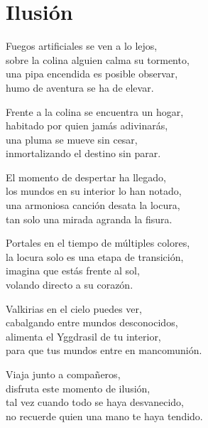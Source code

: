 \section*{Ilusión}
\label{Ilusion}

\vspace{1em}
\begin{center}
Fuegos artificiales se ven a lo lejos,\\ 
sobre la colina alguien calma su tormento,\\ 
una pipa encendida es posible observar,\\ 
humo de aventura se ha de elevar.

\vspace{1em} 
Frente a la colina se encuentra un hogar,\\ 
habitado por quien jamás adivinarás,\\ 
una pluma se mueve sin cesar,\\ 
inmortalizando el destino sin parar.

\vspace{1em} 
El momento de despertar ha llegado,\\ 
los mundos en su interior lo han notado,\\ 
una armoniosa canción desata la locura,\\ 
tan solo una mirada agranda la fisura.

\vspace{1em} 
Portales en el tiempo de múltiples colores,\\ 
la locura solo es una etapa de transición,\\ 
imagina que estás frente al sol,\\ 
volando directo a su corazón.

\vspace{1em} 
Valkirias en el cielo puedes ver,\\ 
cabalgando entre mundos desconocidos,\\ 
alimenta el Yggdrasil de tu interior,\\ 
para que tus mundos entre en mancomunión.

\vspace{1em} 
Viaja junto a compañeros,\\ 
disfruta este momento de ilusión,\\ 
tal vez cuando todo se haya desvanecido,\\ 
no recuerde quien una mano te haya tendido.


\end{center}

